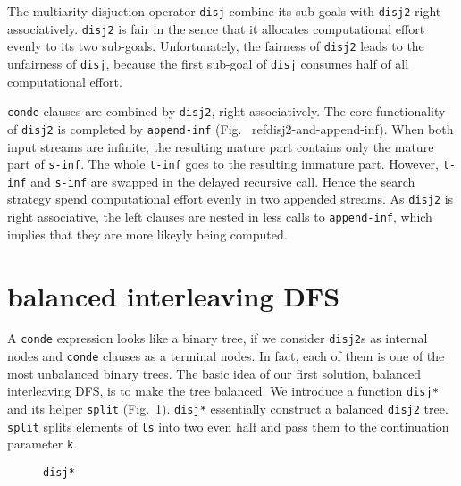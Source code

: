 \documentclass[format=acmlarge, review=true, authordraft=true]{acmart}
\begin{document}
The multiarity disjuction operator \texttt{disj} combine its sub-goals with 
\texttt{disj2} right associatively. \texttt{disj2} is fair in the sence that it 
allocates computational effort evenly to its two sub-goals. Unfortunately, the 
fairness of \texttt{disj2} leads to the unfairness of \texttt{disj}, because the 
first sub-goal of \texttt{disj} consumes half of all computational effort.


\texttt{conde} clauses are combined by \texttt{disj2}, right associatively. The
core functionality of \texttt{disj2} is completed by \texttt{append-inf} (Fig.~
ref{disj2-and-append-inf}). When both input streams are infinite, the resulting
mature part contains only the mature part of \texttt{s-inf}. The whole
\texttt{t-inf} goes to the resulting immature part. However, \texttt{t-inf} and
\texttt{s-inf} are swapped in the delayed recursive call. Hence the search
strategy spend computational effort evenly in two appended streams. As
\texttt{disj2} is right associative, the left clauses are nested in less calls
to \texttt{append-inf}, which implies that they are more likeyly being
computed.

%   
 
\section{balanced interleaving DFS}

A \texttt{conde} expression looks like a binary tree, if we consider 
\texttt{disj2}s as internal nodes and \texttt{conde} clauses as a terminal 
nodes. In fact, each of them is one of the most unbalanced binary trees. The 
basic idea of our first solution, balanced interleaving DFS, is to make the 
tree balanced. We introduce a function \texttt{disj*} and its helper 
\texttt{split} (Fig.~\ref{disj*}). \texttt{disj*} essentially construct a 
balanced \texttt{disj2} tree. \texttt{split} splits elements of \texttt{ls} 
into two even half and pass them to the continuation parameter \texttt{k}.

\begin{figure}
  
  \caption{\texttt{disj*}}
  \label{disj*}
\end{figure}
\end{document}
